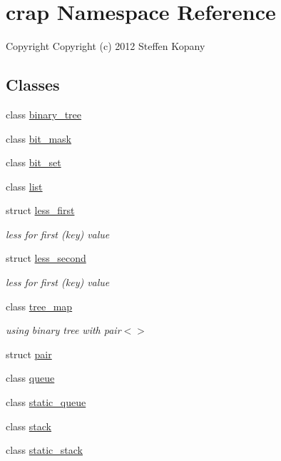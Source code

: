 \hypertarget{namespacecrap}{\section{crap Namespace Reference}
\label{namespacecrap}
}


\begin{DoxyCopyright}{Copyright}
Copyright (c) 2012 Steffen Kopany 
\end{DoxyCopyright}
 


\subsection*{Classes}
\begin{DoxyCompactItemize}
\item 
class \hyperlink{classcrap_1_1binary__tree}{binary\-\_\-tree}
\item 
class \hyperlink{classcrap_1_1bit__mask}{bit\-\_\-mask}
\item 
class \hyperlink{classcrap_1_1bit__set}{bit\-\_\-set}
\item 
class \hyperlink{classcrap_1_1list}{list}
\item 
struct \hyperlink{structcrap_1_1less__first}{less\-\_\-first}
\begin{DoxyCompactList}\small\item\em less for first (key) value \end{DoxyCompactList}\item 
struct \hyperlink{structcrap_1_1less__second}{less\-\_\-second}
\begin{DoxyCompactList}\small\item\em less for first (key) value \end{DoxyCompactList}\item 
class \hyperlink{classcrap_1_1tree__map}{tree\-\_\-map}
\begin{DoxyCompactList}\small\item\em using binary tree with pair$<$$>$ \end{DoxyCompactList}\item 
struct \hyperlink{structcrap_1_1pair}{pair}
\item 
class \hyperlink{classcrap_1_1queue}{queue}
\item 
class \hyperlink{classcrap_1_1static__queue}{static\-\_\-queue}
\item 
class \hyperlink{classcrap_1_1stack}{stack}
\item 
class \hyperlink{classcrap_1_1static__stack}{static\-\_\-stack}

\end{DoxyCompactItemize}
